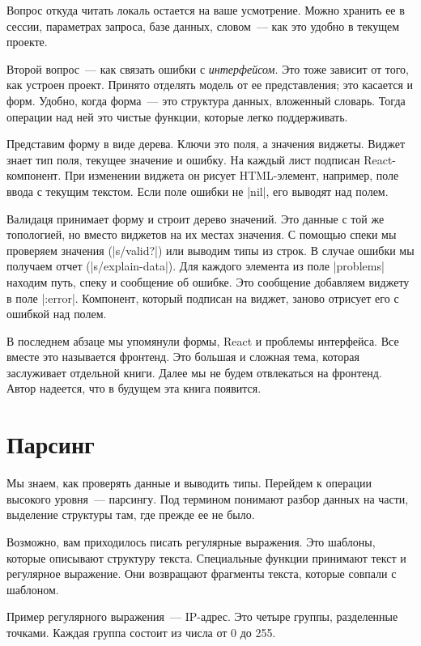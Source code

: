 Вопрос откуда читать локаль остается на ваше усмотрение. Можно хранить ее в
сессии, параметрах запроса, базе данных, словом~--- как это удобно в текущем
проекте.

Второй вопрос~--- как связать ошибки с \emph{интерфейсом}. Это тоже зависит от того,
как устроен проект. Принято отделять модель от ее представления; это касается и
форм. Удобно, когда форма~--- это структура данных, вложенный словарь.
Тогда операции над ней это чистые функции, которые легко поддерживать.

Представим форму в виде дерева. Ключи это поля, а значения виджеты. Виджет знает
тип поля, текущее значение и ошибку. На каждый лист подписан React-компонент.
При изменении виджета он рисует HTML-элемент, например, поле ввода с текущим текстом.
Если поле ошибки не \spverb|nil|, его выводят над полем.

Валидаця принимает форму и строит дерево значений. Это данные с той же
топологией, но вместо виджетов на их местах значения. С помощью спеки мы
проверяем значения (\spverb|s/valid?|) или выводим типы из строк. В случае
ошибки мы получаем отчет (\spverb|s/explain-data|). Для каждого элемента из поле
\spverb|problems| находим путь, спеку и сообщение об ошибке. Это сообщение
добавляем виджету в поле \spverb|:error|. Компонент, который подписан на виджет,
заново отрисует его с ошибкой над полем.

В последнем абзаце мы упомянули формы, React и проблемы интерфейса. Все вместе
это называется фронтенд. Это большая и сложная тема, которая заслуживает
отдельной книги. Далее мы не будем отвлекаться на фронтенд. Автор надеется, что
в будущем эта книга появится.

\section{Парсинг}

Мы знаем, как проверять данные и выводить типы. Перейдем к операции высокого
уровня~--- парсингу. Под термином понимают разбор данных на части, выделение
структуры там, где прежде ее не было.

Возможно, вам приходилось писать регулярные выражения. Это шаблоны, которые
описывают структуру текста. Специальные функции принимают текст и регулярное
выражение. Они возвращают фрагменты текста, которые совпали с шаблоном.

Пример регулярного выражения~--- IP-адрес. Это четыре группы, разделенные
точками. Каждая группа состоит из числа от 0 до 255.

